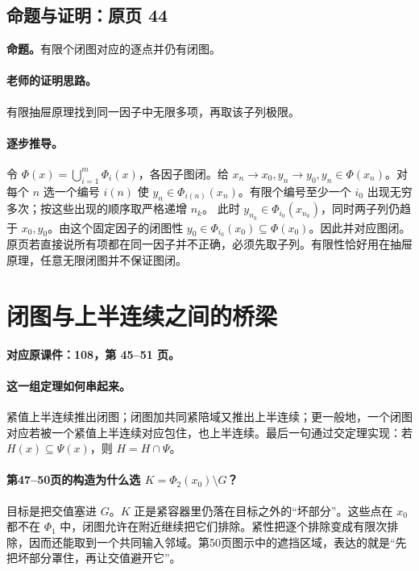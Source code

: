 \subsection{命题与证明：原页 44}

\textbf{命题。}有限个闭图对应的逐点并仍有闭图。

\paragraph{老师的证明思路。}有限抽屉原理找到同一因子中无限多项，再取该子列极限。

\paragraph{逐步推导。}
令 $\Phi(x)=\bigcup_{i=1}^m\Phi_i(x)$，各因子图闭。给 $x_n\to x_0,y_n\to y_0,y_n\in\Phi(x_n)$。对每个 $n$ 选一个编号 $i(n)$ 使 $y_n\in\Phi_{i(n)}(x_n)$。有限个编号至少一个 $i_0$ 出现无穷多次；按这些出现的顺序取严格递增 $n_k$。
此时 $y_{n_k}\in\Phi_{i_0}(x_{n_k})$，同时两子列仍趋于 $x_0,y_0$。由这个固定因子的闭图性 $y_0\in\Phi_{i_0}(x_0)\subseteq\Phi(x_0)$。因此并对应图闭。
原页若直接说所有项都在同一因子并不正确，必须先取子列。有限性恰好用在抽屉原理，任意无限闭图并不保证图闭。


\clearpage\section{闭图与上半连续之间的桥梁}\label{g:108:45}

\textbf{对应原课件：108，第 45--51 页。}


\paragraph{这一组定理如何串起来。}
紧值上半连续推出闭图；闭图加共同紧陪域又推出上半连续；更一般地，一个闭图对应若被一个紧值上半连续对应包住，也上半连续。最后一句通过交定理实现：若 $H(x)\subseteq\Psi(x)$，则 $H=H\cap\Psi$。

\paragraph{第47--50页的构造为什么选 $K=\Phi_2(x_0)\setminus G$？}
目标是把交值塞进 $G$。$K$ 正是紧容器里仍落在目标之外的“坏部分”。这些点在 $x_0$ 都不在 $\Phi_1$ 中，闭图允许在附近继续把它们排除。紧性把逐个排除变成有限次排除，因而还能取到一个共同输入邻域。第50页图示中的遮挡区域，表达的就是“先把坏部分罩住，再让交值避开它”。


